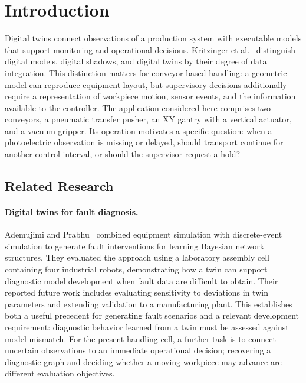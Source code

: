 \section{Introduction}

Digital twins connect observations of a production system with executable models that support monitoring and operational decisions. Kritzinger et al.~\cite{Kritzinger2018} distinguish digital models, digital shadows, and digital twins by their degree of data integration. This distinction matters for conveyor-based handling: a geometric model can reproduce equipment layout, but supervisory decisions additionally require a representation of workpiece motion, sensor events, and the information available to the controller. The application considered here comprises two conveyors, a pneumatic transfer pusher, an XY gantry with a vertical actuator, and a vacuum gripper. Its operation motivates a specific question: when a photoelectric observation is missing or delayed, should transport continue for another control interval, or should the supervisor request a hold?

\subsection{Related Research}

\paragraph{Digital twins for fault diagnosis.}
Ademujimi and Prabhu~\cite{Ademujimi2022} combined equipment simulation with discrete-event simulation to generate fault interventions for learning Bayesian network structures. They evaluated the approach using a laboratory assembly cell containing four industrial robots, demonstrating how a twin can support diagnostic model development when fault data are difficult to obtain. Their reported future work includes evaluating sensitivity to deviations in twin parameters and extending validation to a manufacturing plant. This establishes both a useful precedent for generating fault scenarios and a relevant development requirement: diagnostic behavior learned from a twin must be assessed against model mismatch. For the present handling cell, a further task is to connect uncertain observations to an immediate operational decision; recovering a diagnostic graph and deciding whether a moving workpiece may advance are different evaluation objectives.

